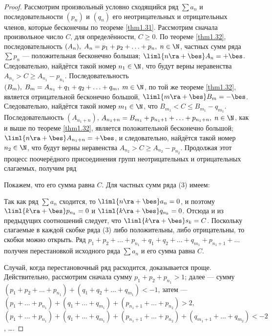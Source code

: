 \documentclass[a4paper]{article}
\begin{document}
\begin{proof}
Рассмотрим произвольный условно сходящийся ряд $\sum a_n$ и
последовательности $(p_n)$ и $(q_n)$ его неотрицательных и
отрицательных членов, которые бесконечны по теореме \ref{thm1.31}.
Рассмотрим сначала произвольное число $C$, для определённости,
$C\ge0$. По теореме \ref{thm1.32}, последовательность $(A_n), \;
A_n=p_1+p_2+\ldots+p_n, \; n\in\N$, частных сумм ряда $\sum p_n$ ---
положительная бесконечно большая; $\liml{n\ra+\bes} A_n = +\bes$.
Следовательно, найдётся такой номер $n_1\in\N$, что будут верны
неравенства $A_{n_1} > C \ge A_{n_1} - p_{n_1}$. Последовательность
$(B_m), \; B_m = A_{n_1} + q_1 + q_2 + \ldots + q_m, \; m\in\N$, по
той же теореме \ref{thm1.32}, является отрицательной бесконечно
большой, $\liml{m\ra+\bes}B_m=-\bes$. Следовательно, найдётся такой
номер $m_1\in\N$, что $B_{m_1} < C \le B_{m_1} - q_{m_1}$.
Последовательность $(A_{n_1+n})$, $A_{n_1+n} = B_{m_1} + p_{n_1+1} +
\ldots + p_{n_1+n}, \; n\in\N$, как и выше по теореме \ref{thm1.32},
является положительной бесконечно большой; $\liml{n\ra+\bes}
A_{n_1+n} = +\bes$, и следовательно, найдётся такой номер
$n_2\in\N$, что будут верны неравенства $A_{n_2} > C \ge A_{n_2} -
p_{n_2}$. Продолжая этот процесс поочерёдного присоединения групп
неотрицательных и отрицательных слагаемых, получим ряд

Покажем, что его сумма равна $C$. Для частных сумм ряда (3) имеем:

Так как ряд $\sum a_n$ сходится, то $\liml{n\ra+\bes} a_n=0$, и
поэтому $\liml{k\ra+\bes} p_{n_k}=0$ и $\liml{k\ra+\bes} q_{n_k}=0$.
Отсюда и из предыдущих соотношений следует, что $\liml{k\ra+\bes}
s_k=C$. Поскольку слагаемые в каждой скобке ряда (3) либо
положительны, либо отрицательны, то скобки можно открыть. Ряд
$p_1+p_2+\ldots + p_{n_1} + q_1 + q_2 + \ldots + q_{m_1} + p_{n_1+1}
+ \ldots$ получен перестановкой исходного ряда $\sum a_n$ и его
сумма равна $C$.

Случай, когда перестановочный ряд расходится, доказывается проще.
Действительно, рассмотрим сначала сумму $p_1 + p_2 + p_{n_1}>1$;
далее --- сумму $(p_1+p_2+\ldots+p_{n_1}) + (q_1+q_2+\ldots+q_{m_1})
< -1$, затем --- $(p_1+\ldots+p_{n_1}) + (q_1+\ldots+q_{m_1}) +
(p_{n_1+1} + \ldots + p_{n_2}) > 2$, $(p_1+\ldots + p_{n_1}) + (q_1
+ \ldots + q_{m_1}) + (p_{n_1+1} + \ldots + p_{n_2}) + (q_{m_1+1} +
\ldots + q_{m_2}) < -2$, \ldots.


\end{proof}
\end{document}
